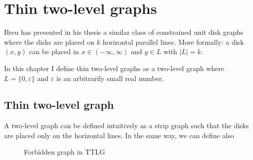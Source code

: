 \chapter{Thin two-level graphs}
\label{chap:twolevel}

Breu \cite{breuAlgorithmicAspectsConstrained1996} has presented in his thesis a similar class of constrained unit disk graphs where the disks are placed on $k$ horizontal parallel lines. More formally: a disk $(x,y)$ can be placed in $x \in (-\infty,\infty)$ and $y \in L$ with $|L| = k$.

In this chapter I define thin two-level graphs as a two-level graph where $L = \{0,\varepsilon\}$ and $\varepsilon$ is an arbitrarily small real number.


\section{Thin two-level graph}

A two-level graph can be defined intuitively as a strip graph such that the disks are placed only on the horizontal lines. In the same way,
we can define also

\begin{figure}
\centering

\begin{scaletikzpicturetowidth}{\textwidth}
\end{scaletikzpicturetowidth}

\caption{ Forbidden graph in TTLG }
\label{fig:forbSigma}
\end{figure}

